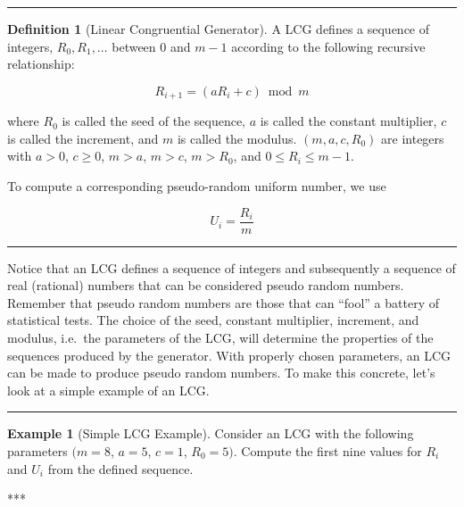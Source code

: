 \documentclass[
]{book}
\theoremstyle{definition}
\newtheorem{definition}{Definition}[chapter]
\theoremstyle{definition}
\newtheorem{example}{Example}[chapter]
\theoremstyle{definition}
\theoremstyle{definition}
\theoremstyle{remark}
\begin{document}
\begin{center}\rule{0.5\linewidth}{0.5pt}\end{center}

\begin{definition}[Linear Congruential Generator]
\protect\hypertarget{def:LCG}{}{\label{def:LCG} {} }A LCG defines a sequence of
integers, \(R_{0}, R_{1}, \ldots\) between \(0\) and \(m-1\) according to the
following recursive relationship:

\[
R_{i+1} = \left(a R_{i} + c\right)\bmod m %
\]

where \(R_{0}\) is called the seed of the sequence, \(a\) is called the
constant multiplier, \(c\) is called the increment, and \(m\) is called the
modulus. \(\left(m, a, c, R_{0}\right)\) are integers with \(a > 0\),
\(c \geq 0\), \(m > a\), \(m > c\), \(m > R_{0}\), and \(0 \leq R_{i} \leq m-1\).

To compute a corresponding pseudo-random uniform number, we use

\[
U_{i} = \frac{R_{i}}{m}
\]
\end{definition}

\begin{center}\rule{0.5\linewidth}{0.5pt}\end{center}

Notice that an LCG defines a sequence of integers and subsequently a
sequence of real (rational) numbers that can be considered pseudo random
numbers. Remember that pseudo random numbers are those that can ``fool'' a
battery of statistical tests. The choice of the seed, constant
multiplier, increment, and modulus, i.e.~the parameters of the LCG, will
determine the properties of the sequences produced by the generator.
With properly chosen parameters, an LCG can be made to produce pseudo
random numbers. To make this concrete, let's look at a simple example of
an LCG.

\begin{center}\rule{0.5\linewidth}{0.5pt}\end{center}

\begin{example}[Simple LCG Example]
\protect\hypertarget{exm:SimpleLCG}{}{\label{exm:SimpleLCG} {} }Consider an LCG
with the following parameters \((m = 8\), \(a = 5\), \(c = 1\), \(R_{0} = 5)\). Compute
the first nine values for \(R_{i}\) and \(U_{i}\) from the defined
sequence.
\end{example}
***
\end{document}
